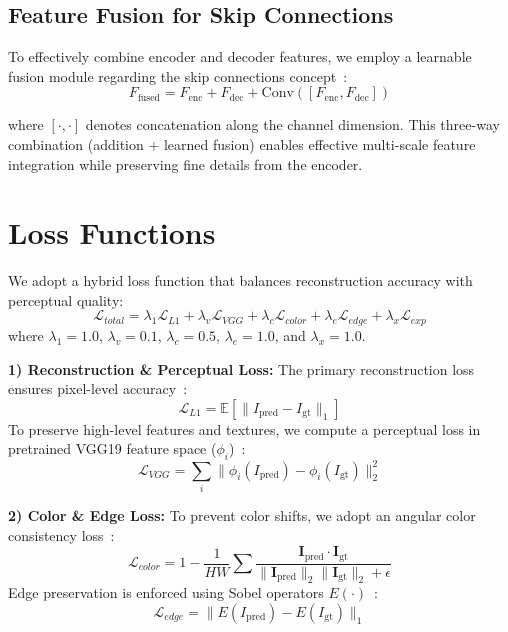 \documentclass[conference]{IEEEtran}
\begin{document}
\subsection{Feature Fusion for Skip Connections}

To effectively combine encoder and decoder features, we employ a learnable fusion module regarding the skip connections concept~\cite{ronneberger2015unet}:
\begin{equation}
F_{\text{fused}} = F_{\text{enc}} + F_{\text{dec}} + \text{Conv}([F_{\text{enc}}, F_{\text{dec}}])
\end{equation}

where $[\cdot, \cdot]$ denotes concatenation along the channel dimension. This three-way combination (addition + learned fusion) enables effective multi-scale feature integration while preserving fine details from the encoder.

\section{Loss Functions}

We adopt a hybrid loss function that balances reconstruction accuracy with perceptual quality:
\begin{equation}
\mathcal{L}_{total} = \lambda_1 \mathcal{L}_{L1} + \lambda_v \mathcal{L}_{VGG} + \lambda_c \mathcal{L}_{color} + \lambda_e \mathcal{L}_{edge} + \lambda_x \mathcal{L}_{exp}
\end{equation}
where $\lambda_1 = 1.0$, $\lambda_v = 0.1$, $\lambda_c = 0.5$, $\lambda_e = 1.0$, and $\lambda_x = 1.0$.

\textbf{1) Reconstruction \& Perceptual Loss:} The primary reconstruction loss ensures pixel-level accuracy~\cite{isola2016pix2pix}:
\begin{equation}
\mathcal{L}_{L1} = \mathbb{E}[\|I_{\text{pred}} - I_{\text{gt}}\|_1]
\end{equation}
To preserve high-level features and textures, we compute a perceptual loss in pretrained VGG19 feature space ($\phi_i$)~\cite{simonyan2014vgg, ledig2016srgan, zhang2018lpips}:
\begin{equation}
\mathcal{L}_{VGG} = \sum_{i} \|\phi_i(I_{\text{pred}}) - \phi_i(I_{\text{gt}})\|_2^2
\end{equation}

\textbf{2) Color \& Edge Loss:} To prevent color shifts, we adopt an angular color consistency loss~\cite{park2023dualcolor}:
\begin{equation}
\mathcal{L}_{color} = 1 - \frac{1}{HW}\sum \frac{\mathbf{I}_{\text{pred}} \cdot \mathbf{I}_{\text{gt}}}{\|\mathbf{I}_{\text{pred}}\|_2 \|\mathbf{I}_{\text{gt}}\|_2 + \epsilon}
\end{equation}
Edge preservation is enforced using Sobel operators $E(\cdot)$~\cite{edrnet2025edgematching}:
\begin{equation}
\mathcal{L}_{edge} = \|E(I_{\text{pred}}) - E(I_{\text{gt}})\|_1
\end{equation}
\end{document}
